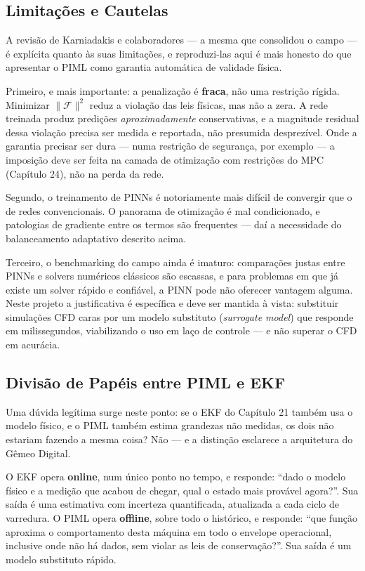 \documentclass[12pt,a4paper]{article}
\numberwithin{equation}{section}
\numberwithin{table}{section}
\numberwithin{figure}{section}
\begin{document}
	\subsection{Limitações e Cautelas}

	A revisão de Karniadakis e colaboradores \cite{piml2} — a mesma que consolidou o campo — é explícita quanto às suas limitações, e reproduzi-las aqui é mais honesto do que apresentar o PIML como garantia automática de validade física.

	Primeiro, e mais importante: a penalização é \textbf{fraca}, não uma restrição rígida. Minimizar $\| \mathcal{F} \|^2$ reduz a violação das leis físicas, mas não a zera. A rede treinada produz predições \textit{aproximadamente} conservativas, e a magnitude residual dessa violação precisa ser medida e reportada, não presumida desprezível. Onde a garantia precisar ser dura — numa restrição de segurança, por exemplo — a imposição deve ser feita na camada de otimização com restrições do MPC (Capítulo 24), não na perda da rede.

	Segundo, o treinamento de PINNs é notoriamente mais difícil de convergir que o de redes convencionais. O panorama de otimização é mal condicionado, e patologias de gradiente entre os termos são frequentes — daí a necessidade do balanceamento adaptativo descrito acima.

	Terceiro, o benchmarking do campo ainda é imaturo: comparações justas entre PINNs e solvers numéricos clássicos são escassas, e para problemas em que já existe um solver rápido e confiável, a PINN pode não oferecer vantagem alguma. Neste projeto a justificativa é específica e deve ser mantida à vista: substituir simulações CFD caras por um modelo substituto (\textit{surrogate model}) que responde em milissegundos, viabilizando o uso em laço de controle — e não superar o CFD em acurácia.

	\subsection{Divisão de Papéis entre PIML e EKF}

	Uma dúvida legítima surge neste ponto: se o EKF do Capítulo 21 também usa o modelo físico, e o PIML também estima grandezas não medidas, os dois não estariam fazendo a mesma coisa? Não — e a distinção esclarece a arquitetura do Gêmeo Digital.

	O EKF opera \textbf{online}, num único ponto no tempo, e responde: ``dado o modelo físico e a medição que acabou de chegar, qual o estado mais provável agora?''. Sua saída é uma estimativa com incerteza quantificada, atualizada a cada ciclo de varredura. O PIML opera \textbf{offline}, sobre todo o histórico, e responde: ``que função aproxima o comportamento desta máquina em todo o envelope operacional, inclusive onde não há dados, sem violar as leis de conservação?''. Sua saída é um modelo substituto rápido.
\end{document}
